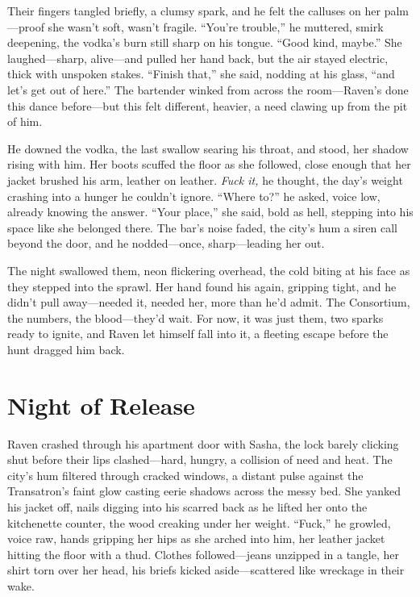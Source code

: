 \documentclass[12pt]{book}
\begin{document}
Their fingers tangled briefly, a clumsy spark, and he felt the calluses on her palm—proof she wasn’t soft, wasn’t fragile. “You’re trouble,” he muttered, smirk deepening, the vodka’s burn still sharp on his tongue. “Good kind, maybe.” She laughed—sharp, alive—and pulled her hand back, but the air stayed electric, thick with unspoken stakes. “Finish that,” she said, nodding at his glass, “and let’s get out of here.” The bartender winked from across the room—Raven’s done this dance before—but this felt different, heavier, a need clawing up from the pit of him.

He downed the vodka, the last swallow searing his throat, and stood, her shadow rising with him. Her boots scuffed the floor as she followed, close enough that her jacket brushed his arm, leather on leather. \textit{Fuck it,} he thought, the day’s weight crashing into a hunger he couldn’t ignore. “Where to?” he asked, voice low, already knowing the answer. “Your place,” she said, bold as hell, stepping into his space like she belonged there. The bar’s noise faded, the city’s hum a siren call beyond the door, and he nodded—once, sharp—leading her out.

The night swallowed them, neon flickering overhead, the cold biting at his face as they stepped into the sprawl. Her hand found his again, gripping tight, and he didn’t pull away—needed it, needed her, more than he’d admit. The Consortium, the numbers, the blood—they’d wait. For now, it was just them, two sparks ready to ignite, and Raven let himself fall into it, a fleeting escape before the hunt dragged him back.

\section{Night of Release}

Raven crashed through his apartment door with Sasha, the lock barely clicking shut before their lips clashed—hard, hungry, a collision of need and heat. The city’s hum filtered through cracked windows, a distant pulse against the Transatron’s faint glow casting eerie shadows across the messy bed. She yanked his jacket off, nails digging into his scarred back as he lifted her onto the kitchenette counter, the wood creaking under her weight. “Fuck,” he growled, voice raw, hands gripping her hips as she arched into him, her leather jacket hitting the floor with a thud. Clothes followed—jeans unzipped in a tangle, her shirt torn over her head, his briefs kicked aside—scattered like wreckage in their wake.
\end{document}
